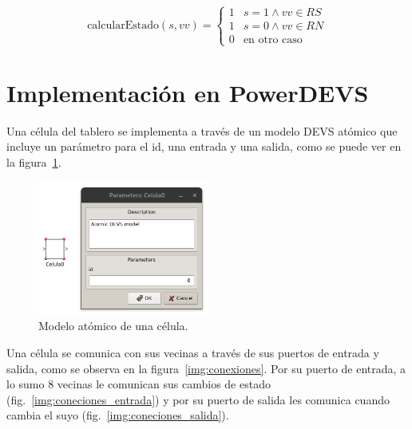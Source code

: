 \documentclass[12pt]{article}
\begin{document}
\[ \text{calcularEstado}(s, vv) = \begin{cases}
  1 & s = 1 \land vv \in RS \\
  1 & s = 0 \land vv \in RN \\
  0 & \text{en otro caso}
\end{cases}\]


\section{Implementación en PowerDEVS}


Una célula del tablero se implementa a través de un modelo DEVS atómico que incluye un parámetro para el id, una entrada y una salida, como se puede ver en la figura~\ref{img:celula}.

\begin{figure}[ht]
  \centering
  \includegraphics[width=0.5\textwidth]{imagenes/celula.png}
  \caption{Modelo atómico de una célula.}\label{img:celula}
\end{figure}

Una célula se comunica con sus vecinas a través de sus puertos de entrada y salida, como se observa en la figura~\ref{img:conexiones}. Por su puerto de entrada, a lo sumo 8 vecinas le comunican sus cambios de estado (fig.~\ref{img:coneciones_entrada}) y por su puerto de salida les comunica cuando cambia el suyo (fig.~\ref{img:coneciones_salida}).
\end{document}
